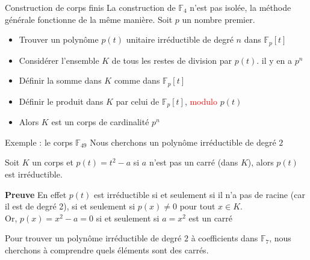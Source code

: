 \begin{parag}{Construction de corps finis}
    La construction de $\mathbb{F}_4$ n'est pas isolée, la méthode générale fonctionne de la même manière. Soit $p$ un nombre premier.
    \begin{itemize}
        \item Trouver un polynôme $p(t)$ unitaire irréductible de degré $n$ dans $\mathbb{F}_p[t]$
        \item Considérer l'ensemble $K$ de tous les restes de division par $p(t)$. il y en a $p^n$
        \item Définir la somme dans $K$ comme dans $\mathbb{F}_p[t]$
        \item Définir le produit dans $K$ par celui de $\mathbb{F}_p[t]$, \textcolor{red}{modulo} $p(t)$
        \item Alors $K$ est un corps de cardinalité $p^n$
    \end{itemize}

    \begin{subparag}{Exemple : le corps $\mathbb{F}_{49}$}
        Nous cherchons un polynôme irréductible de degré $2$
        \begin{proposition}
            Soit $K$ un corps et $p(t) = t^2 - a$ si $a$ n'est pas un carré (dans $K$), alors $p(t)$ est irréductible.
        \end{proposition}
        \textbf{Preuve}
        En effet $p(t)$ est irréductible si et seulement si il n'a pas de racine (car il est de degré 2), si et seulement si $p(x) \neq 0$ pour tout $x \in K$.
        \\
        Or, $p(x) = x^2 - a = 0$ si et seulement si $a = x^2$ est un carré
        \begin{framedremark}
            Pour trouver un polynôme irréductible de degré $2$ à coefficients dans $\mathbb{F}_7$, nous cherchons à comprendre quels éléments sont des carrés.
        \end{framedremark}


\end{subparag}
\end{parag}
